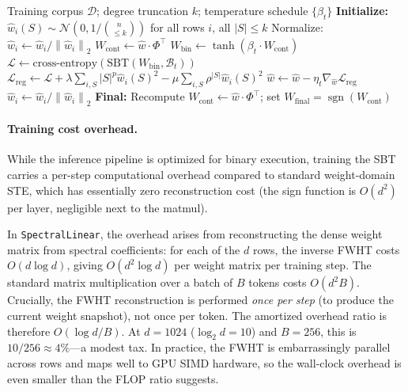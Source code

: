 \documentclass[12pt,a4paper]{article}
\theoremstyle{plain}
\theoremstyle{definition}
\theoremstyle{remark}
\newcommand{\what}{\widehat{w}}
\newcommand{\sgn}{\operatorname{sgn}}
\newcommand{\norm}[1]{\left\| #1 \right\|}
\begin{document}
\begin{algorithm}[H]
\caption{SBT Training}\label{alg:sbt-training}
\begin{algorithmic}[1]
\Require Training corpus $\mathcal{D}$; degree truncation $k$; temperature schedule $\{\beta_t\}$
\State \textbf{Initialize:} $\what_i(S) \sim \mathcal{N}(0, 1/\binom{n}{\leq k})$ for all rows $i$, all $|S| \leq k$
\State Normalize: $\what_i \leftarrow \what_i / \norm{\what_i}_2$
    \State $W_{\text{cont}} \leftarrow \what \cdot \Phi^\top$ 
    \State $W_{\text{bin}} \leftarrow \tanh(\beta_t \cdot W_{\text{cont}})$ 
    \State $\mathcal{L} \leftarrow \text{cross-entropy}(\text{SBT}(W_{\text{bin}}, \mathcal{B}_t))$
    \State $\mathcal{L}_{\text{reg}} \leftarrow \mathcal{L} + \lambda \sum_{i,S} |S|^p \what_i(S)^2 - \mu \sum_{i,S} \rho^{|S|} \what_i(S)^2$
    \State $\what \leftarrow \what - \eta_t \nabla_{\what} \mathcal{L}_{\text{reg}}$
    \State $\what_i \leftarrow \what_i / \norm{\what_i}_2$ 
\EndFor
\State \textbf{Final:} Recompute $W_{\text{cont}} \leftarrow \what \cdot \Phi^\top$; set $W_{\text{final}} = \sgn(W_{\text{cont}})$ \Comment{hard binarization; discard $\what$}
\end{algorithmic}
\end{algorithm}

\paragraph{Training cost overhead.}
While the inference pipeline is optimized for binary execution, training the SBT carries a per-step computational overhead compared to standard weight-domain STE, which has essentially zero reconstruction cost (the sign function is $O(d^2)$ per layer, negligible next to the matmul).

In \texttt{SpectralLinear}, the overhead arises from reconstructing the dense weight matrix from spectral coefficients: for each of the $d$ rows, the inverse FWHT costs $O(d \log d)$, giving $O(d^2 \log d)$ per weight matrix per training step. The standard matrix multiplication over a batch of $B$ tokens costs $O(d^2 B)$. Crucially, the FWHT reconstruction is performed \emph{once per step} (to produce the current weight snapshot), not once per token. The amortized overhead ratio is therefore $O(\log d / B)$. At $d = 1024$ ($\log_2 d = 10$) and $B = 256$, this is $10/256 \approx 4\%$---a modest tax. In practice, the FWHT is embarrassingly parallel across rows and maps well to GPU SIMD hardware, so the wall-clock overhead is even smaller than the FLOP ratio suggests.
\end{document}
